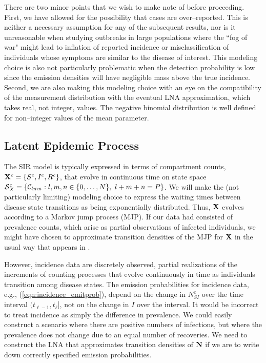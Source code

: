 There are two minor points that we wish to make note of before proceeding. First, we have allowed for the possibility that cases are over--reported. This is neither a necessary assumption for any of the subsequent results, nor is it unreasonable when studying outbreaks in large populations where the ``fog of war" might lead to inflation of reported incidence or misclassification of individuals whose symptoms are similar to the disease of interest. This modeling choice is also not particularly problematic when the detection probability is low since the emission densities will have negligible mass above the true incidence. Second, we are also making this modeling choice with an eye on the compatibility of the measurement distribution with the eventual LNA approximation, which takes real, not integer, values. The negative binomial distribution is well defined for non--integer values of the mean parameter. 

\subsection{Latent Epidemic Process}
\label{subsec:lna_epid_proc}

The SIR model is typically expressed in terms of compartment counts, $ \mathbf{X}^c = \lbrace S^c,I^c,R^c\rbrace $, that evolve in continuous time on state space $ \mathcal{S}_X^c = \left \lbrace \mathcal{C}_{lmn}:l,m,n\in\lbrace0,\dots,N\rbrace,\ l+m+n=P\right \rbrace $. We will make the (not particularly limiting) modeling choice to express the waiting times between disease state transitions as being exponentially distributed. Thus, $ \mathbf{X} $ evolves according to a Markov jump process (MJP). If our data had consisted of prevalence counts, which arise as partial observations of infected individuals, we might have chosen to approximate transition densities of the MJP for $ \mathbf{X} $ in the usual way that appears in \cite{komorowski2009,fearnhead2014}. 

However, incidence data are discretely observed, partial realizations of the increments of counting processes that evolve continuously in time as individuals transition among disease states. The emission probabilities for incidence data, e.g., (\ref{eqn:incidence_emitprob}), depend on the change in $ N_{SI}^c $ over the time interval $ (t_{\ell-1},t_\ell] $, not on the change in $ I $ over the interval. It would be incorrect to treat incidence as simply the difference in prevalence. We could easily construct a scenario where there are positive numbers of infections, but where the prevalence does not change due to an equal number of recoveries. We need to construct the LNA that approximates transition densities of $ \mathbf{N} $ if we are to write down correctly specified emission probabilities.


